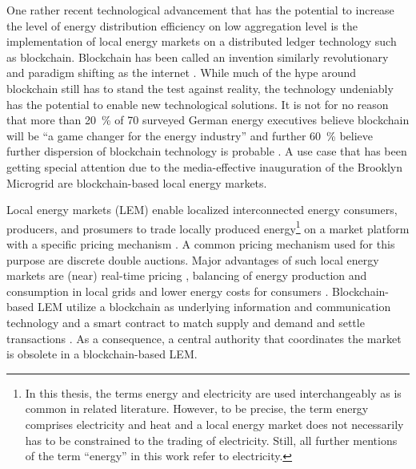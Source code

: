 One rather recent technological advancement that has the potential to increase the level of energy distribution efficiency on low aggregation level is the implementation of local energy markets on a distributed ledger technology such as blockchain. Blockchain has been called an invention similarly revolutionary and paradigm shifting as the internet \citep{Swan:2015}. While much of the hype around blockchain still has to stand the test against reality, the technology undeniably has the potential to enable new technological solutions. It is not for no reason that more than 20~\% of 70 surveyed German energy executives believe blockchain will be “a game changer for the energy industry” and further 60~\% believe further dispersion of blockchain technology is probable \citep{Burger:2016}. A use case that has been getting special attention due to the media-effective inauguration of the Brooklyn Microgrid \citep{newscientist:2016} are blockchain-based local energy markets.

Local energy markets (LEM) enable localized interconnected energy consumers, producers, and prosumers to trade locally produced energy\footnote{In this thesis, the terms energy and electricity are used interchangeably as is common in related literature. However, to be precise, the term energy comprises electricity and heat and a local energy market does not necessarily has to be constrained to the trading of electricity. Still, all further mentions of the term ``energy'' in this work refer to electricity.} on a market platform with a specific pricing mechanism \citep{Mengelkamp:2018a}. A common pricing mechanism used for this purpose are discrete double auctions\citep{Lamparter:2010, Buchmann:2013, Block:2008}. Major advantages of such local energy markets are (near) real-time pricing \citep{Mihaylov:2014}, balancing of energy production and consumption in local grids \citep{Stadler:2016} and lower energy costs for consumers \citep{Mengelkamp:2018agentstrategies}. Blockchain-based LEM utilize a blockchain as underlying information and communication technology and a smart contract to match supply and demand and settle transactions \citep{Mengelkamp:2018b}. As a consequence, a central authority that coordinates the market is obsolete in a blockchain-based LEM.

